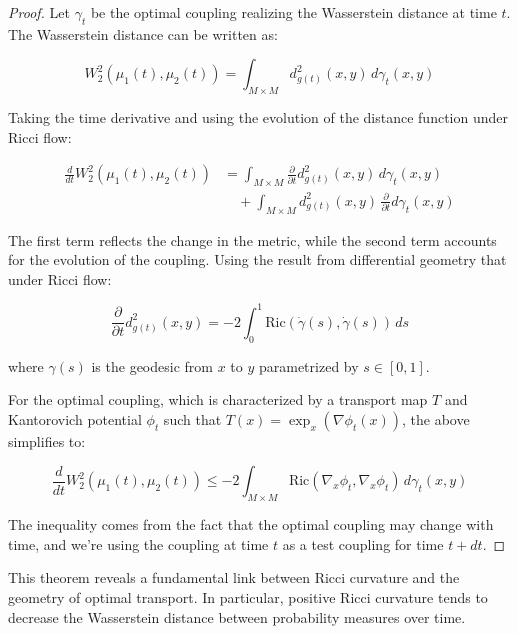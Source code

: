 \documentclass[12pt,a4paper]{article}
\begin{document}
\begin{proof}
Let $\gamma_t$ be the optimal coupling realizing the Wasserstein distance at time $t$. The Wasserstein distance can be written as:

\begin{equation}
W_2^2(\mu_1(t), \mu_2(t)) = \int_{M \times M} d_{g(t)}^2(x, y) \, d\gamma_t(x, y)
\end{equation}

Taking the time derivative and using the evolution of the distance function under Ricci flow:

\begin{align}
\frac{d}{dt}W_2^2(\mu_1(t), \mu_2(t)) &= \int_{M \times M} \frac{\partial}{\partial t}d_{g(t)}^2(x, y) \, d\gamma_t(x, y) \\
&\quad + \int_{M \times M} d_{g(t)}^2(x, y) \, \frac{\partial}{\partial t}d\gamma_t(x, y)
\end{align}

The first term reflects the change in the metric, while the second term accounts for the evolution of the coupling. Using the result from differential geometry that under Ricci flow:

\begin{equation}
\frac{\partial}{\partial t}d_{g(t)}^2(x, y) = -2\int_0^1 \text{Ric}(\dot{\gamma}(s), \dot{\gamma}(s)) \, ds
\end{equation}

\noindent where $\gamma(s)$ is the geodesic from $x$ to $y$ parametrized by $s \in [0, 1]$.

For the optimal coupling, which is characterized by a transport map $T$ and Kantorovich potential $\phi_t$ such that $T(x) = \exp_x(\nabla \phi_t(x))$, the above simplifies to:

\begin{equation}
\frac{d}{dt}W_2^2(\mu_1(t), \mu_2(t)) \leq -2 \int_{M \times M} \text{Ric}(\nabla_x \phi_t, \nabla_x \phi_t) \, d\gamma_t(x, y)
\end{equation}

The inequality comes from the fact that the optimal coupling may change with time, and we're using the coupling at time $t$ as a test coupling for time $t + dt$.
\end{proof}

This theorem reveals a fundamental link between Ricci curvature and the geometry of optimal transport. In particular, positive Ricci curvature tends to decrease the Wasserstein distance between probability measures over time.
\end{document}
